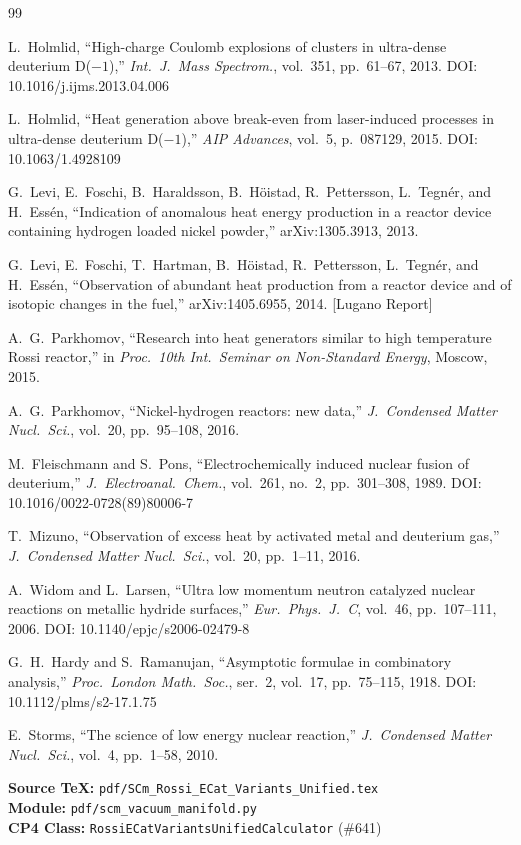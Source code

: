 \documentclass[11pt,a4paper]{article}
\begin{document}
\begin{thebibliography}{99}

L.~Holmlid,
``High-charge Coulomb explosions of clusters in ultra-dense deuterium D($-1$),''
\textit{Int.\ J.\ Mass Spectrom.}, vol.~351, pp.~61--67, 2013.
\newblock DOI: 10.1016/j.ijms.2013.04.006

L.~Holmlid,
``Heat generation above break-even from laser-induced processes in ultra-dense
deuterium D($-1$),''
\textit{AIP Advances}, vol.~5, p.~087129, 2015.
\newblock DOI: 10.1063/1.4928109

G.~Levi, E.~Foschi, B.~Haraldsson, B.~H{\"o}istad, R.~Pettersson,
L.~Tegn{\'e}r, and H.~Ess{\'e}n,
``Indication of anomalous heat energy production in a reactor device containing
hydrogen loaded nickel powder,''
arXiv:1305.3913, 2013.

G.~Levi, E.~Foschi, T.~Hartman, B.~H{\"o}istad, R.~Pettersson,
L.~Tegn{\'e}r, and H.~Ess{\'e}n,
``Observation of abundant heat production from a reactor device and of isotopic
changes in the fuel,''
arXiv:1405.6955, 2014. [Lugano Report]

A.~G.~Parkhomov,
``Research into heat generators similar to high temperature Rossi reactor,''
in \textit{Proc.\ 10th Int.\ Seminar on Non-Standard Energy}, Moscow, 2015.

A.~G.~Parkhomov,
``Nickel-hydrogen reactors: new data,''
\textit{J.\ Condensed Matter Nucl.\ Sci.}, vol.~20, pp.~95--108, 2016.

M.~Fleischmann and S.~Pons,
``Electrochemically induced nuclear fusion of deuterium,''
\textit{J.\ Electroanal.\ Chem.}, vol.~261, no.~2, pp.~301--308, 1989.
\newblock DOI: 10.1016/0022-0728(89)80006-7

T.~Mizuno,
``Observation of excess heat by activated metal and deuterium gas,''
\textit{J.\ Condensed Matter Nucl.\ Sci.}, vol.~20, pp.~1--11, 2016.

A.~Widom and L.~Larsen,
``Ultra low momentum neutron catalyzed nuclear reactions on metallic hydride
surfaces,''
\textit{Eur.\ Phys.\ J.\ C}, vol.~46, pp.~107--111, 2006.
\newblock DOI: 10.1140/epjc/s2006-02479-8

G.~H.~Hardy and S.~Ramanujan,
``Asymptotic formulae in combinatory analysis,''
\textit{Proc.\ London Math.\ Soc.}, ser.~2, vol.~17, pp.~75--115, 1918.
\newblock DOI: 10.1112/plms/s2-17.1.75

E.~Storms,
``The science of low energy nuclear reaction,''
\textit{J.\ Condensed Matter Nucl.\ Sci.}, vol.~4, pp.~1--58, 2010.

\end{thebibliography}

\bigskip\noindent
\textbf{Source TeX:} \texttt{pdf/SCm\_Rossi\_ECat\_Variants\_Unified.tex}\\
\textbf{Module:} \texttt{pdf/scm\_vacuum\_manifold.py}\\
\textbf{CP4 Class:} \texttt{RossiECatVariantsUnifiedCalculator} (\#641)
\end{document}
